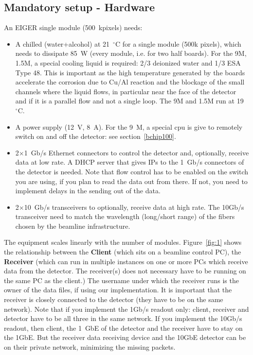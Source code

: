 \documentclass{article}
\begin{document}
\subsection{Mandatory setup - Hardware}
An EIGER single module (500~kpixels) needs:
\begin{itemize}
\item A chilled (water+alcohol) at 21~$^{\circ}$C for a single module (500k pixels), which needs to dissipate 85~W (every module, i.e. for two half boards). For the 9M, 1.5M, a special cooling liquid is required: 2/3 deionized water and 1/3 ESA Type 48. This is important as the high temperature generated by the boards accelerate the corrosion due to Cu/Al reaction and the blockage of the small channels where the liquid flows, in particular near the face of the detector and if it is a parallel flow and not a single loop. The 9M and 1.5M run at 19~$^{\circ}$C.  
\item A power supply (12~V, 8~A). For the 9~M, a special cpu is give to remotely switch on and off the detector: see section~\ref{bchip100}. 
\item 2$\times$1~Gb/s Ethernet connectors to control the detector and, optionally, receive data at low rate. A DHCP server that gives IPs to the 1~Gb/s connectors of the detector is needed. Note that flow control has to be enabled on the switch you are using, if you plan to read the data out from there. If not, you need to implement delays in the sending out of the data.
\item 2$\times$10~Gb/s transceivers to optionally, receive data at high rate. The 10Gb/s transceiver need to match the wavelength (long/short range) of the fibers chosen by the beamline infrastructure.
\end{itemize}
The equipment scales linearly with the number of modules.
Figure~\ref{fig:1} shows the relationship between the \textbf{Client} (which sits on a beamline control PC), the \textbf{Receiver} (which can run in multiple instances on one or more PCs which receive data from the detector. The receiver(s) does not necessary have to be running on the same PC as the client.) The username under which the receiver runs is the owner of the data files, if using our implementation. It is important that the receiver is closely connected to the detector (they have to be on the same network). Note that if you implement the 1Gb/s readout only: client, receiver and detector have to be all three in the same network. If you implement the 10Gb/s readout, then client, the 1~GbE of the detector and the receiver have to stay on the 1GbE. But the receiver data receiving device and the 10GbE detector can be on their private network, minimizing the missing packets.  
\end{document}
